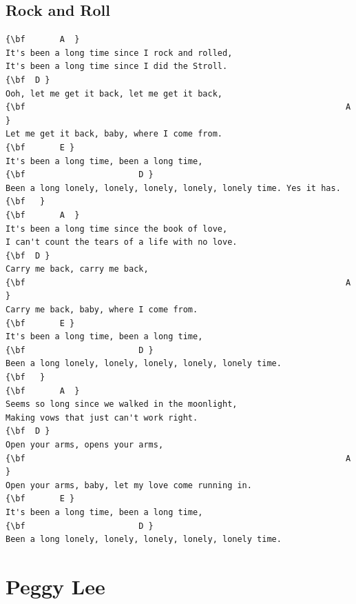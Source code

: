 \documentclass[a4paper]{article}
\begin{document}
\subsection{Rock and Roll}
\begin{Verbatim}[commandchars=\\\{\}]
{\bf       A  }
It's been a long time since I rock and rolled,  
It's been a long time since I did the Stroll.  
{\bf  D }
Ooh, let me get it back, let me get it back,  
{\bf                                                                 A }
Let me get it back, baby, where I come from.  
{\bf       E }
It's been a long time, been a long time,  
{\bf                       D }
Been a long lonely, lonely, lonely, lonely, lonely time. Yes it has.  
{\bf   }
{\bf       A  }
It's been a long time since the book of love,  
I can't count the tears of a life with no love.  
{\bf  D }
Carry me back, carry me back,  
{\bf                                                                 A }
Carry me back, baby, where I come from.  
{\bf       E }
It's been a long time, been a long time,  
{\bf                       D }
Been a long lonely, lonely, lonely, lonely, lonely time.  
{\bf   }
{\bf       A  }
Seems so long since we walked in the moonlight,  
Making vows that just can't work right.  
{\bf  D }
Open your arms, opens your arms,  
{\bf                                                                 A }
Open your arms, baby, let my love come running in.  
{\bf       E }
It's been a long time, been a long time,  
{\bf                       D }
Been a long lonely, lonely, lonely, lonely, lonely time. 

\end{Verbatim}
\newpage
\section{Peggy Lee}
\end{document}
